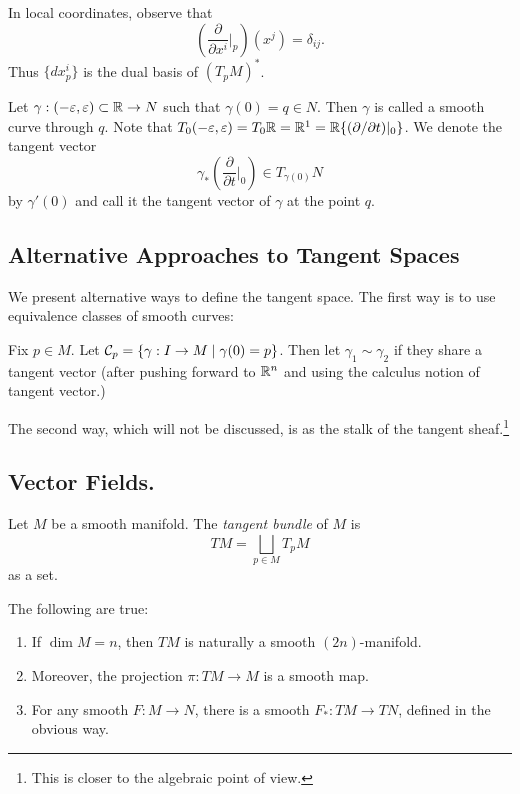 \documentclass[twoside, 10pt]{article}
\begin{document}
    In local coordinates, observe that \[ \left( \frac{\partial}{\partial x^i}
    \bigg\vert_p  \right) (x^j) = \delta_{ij}.\] Thus $\{dx^i_p\}$ is the dual
    basis of $(T_pM)^*$.

    \begin{exm} Let $\gamma: (-\varepsilon, \varepsilon) \subset \mathbb{R} \to N$ such that $\gamma(0)
        = q \in N$. Then $\gamma$ is called a smooth curve through $q$. Note
        that $T_0(-\varepsilon,\varepsilon) = T_0\mathbb{R} = \mathbb{R}^1 = \mathbb{R}\{(\partial/\partial t)|_0\}$.
        We denote the tangent vector \[\gamma_* \left( \frac{\partial}{\partial
        t}\bigg\vert_0 \right) \in T_{\gamma(0)}N\] by $\gamma'(0)$ and call it
    the tangent vector of $\gamma$ at the point $q$.  \end{exm}

    \subsection{Alternative Approaches to Tangent Spaces}%
    \label{sub:alternative_approaches_to_tangent_spaces}

    We present alternative ways to define the tangent space. The first way is
    to use equivalence classes of smooth curves:

    Fix $p \in M$. Let $\mathcal{C}_p = \{\gamma:I \to M \mid \gamma(0) = p\}$. Then
    let $\gamma_1 \sim \gamma_2$ if they share a tangent vector (after pushing
    forward to $\mathbb{R}^n$ and using the calculus notion of tangent vector.)

    The second way, which will not be discussed, is as the stalk of the tangent
    sheaf.\footnote{This is closer to the algebraic point of view.}

    \subsection{Vector Fields.}%
    
    \begin{defn} Let $M$ be a smooth manifold. The \textit{tangent bundle} of
        $M$ is \[TM = \bigsqcup_{p \in M} T_pM\] as a set.  \end{defn}

    \begin{thm} The following are true: \begin{enumerate} \item If $\dim M =
        n$, then $TM$ is naturally a smooth $(2n)$-manifold.  \item Moreover,
        the projection $\pi:TM \to M$ is a smooth map.  \item For any smooth
        $F:M \to N$, there is a smooth $F_*: TM \to TN$, defined in the obvious
        way.  \end{enumerate} \end{thm}
\end{document}

